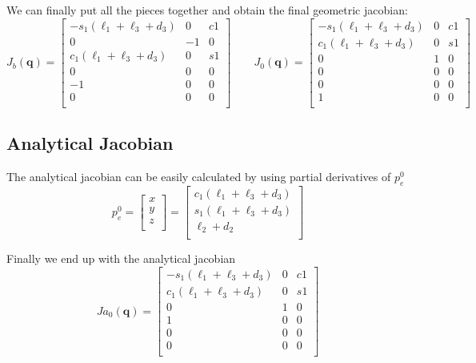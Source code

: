\documentclass[a4paper,12pt]{article}
\renewcommand*{\l}{\ell}
\newcommand*{\q}{\bm{q}}
\begin{document}
We can finally put all the pieces together and obtain the final geometric jacobian:
\[
J_b(\q) = 
\begin{bmatrix}
    -s_1(\l_1 + \l_3 + d_3) &  0 & c1 \\
     0 &  -1 & 0 \\
     c_1(\l_1 + \l_3 + d_3) & 0 & s1 \\
    0 & 0 & 0 \\
    -1 & 0 & 0 \\
    0 & 0 & 0 \\
\end{bmatrix}
\qquad
J_0(\q) = 
\begin{bmatrix}
    -s_1(\l_1 + \l_3 + d_3) &  0 & c1 \\
    c_1(\l_1 + \l_3 + d_3) & 0 & s1 \\
     0 &  1 & 0 \\
    0 & 0 & 0 \\
    0 & 0 & 0 \\
    1 & 0 & 0 \\
\end{bmatrix}
\]

\subsection{Analytical Jacobian}
The analytical jacobian can be easily calculated by using partial derivatives of $p^0_e$
\[
p^0_e = \begin{bmatrix}
    x \\ y \\ z \\
\end{bmatrix}
=
\begin{bmatrix}
    c_1(\l_1+\l_3+d_3)\\
    s_1(\l_1+\l_3+d_3)\\
    \l_2 + d_2 \\
\end{bmatrix}
\]

\noindent Finally we end up with the analytical jacobian
\[
Ja_0(\q) = 
\begin{bmatrix}
    -s_1(\l_1 + \l_3 + d_3) &  0 & c1 \\
    c_1(\l_1 + \l_3 + d_3) & 0 & s1 \\
     0 &  1 & 0 \\
    1 & 0 & 0 \\
    0 & 0 & 0 \\
    0 & 0 & 0 \\
\end{bmatrix}
\]
\end{document}

